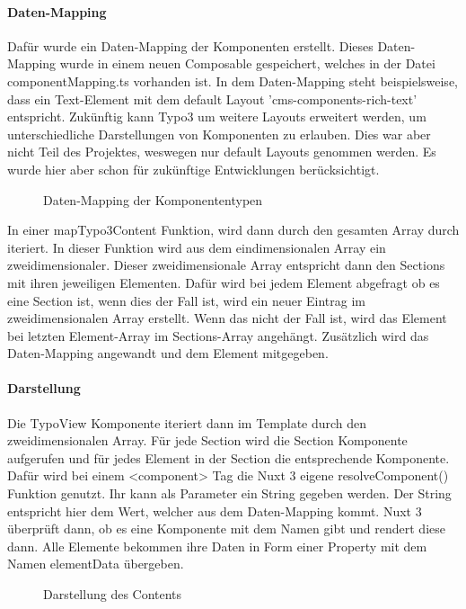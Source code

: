 \paragraph{Daten-Mapping}

Dafür wurde ein Daten-Mapping der Komponenten erstellt. Dieses Daten-Mapping wurde in einem neuen Composable gespeichert, welches in der Datei componentMapping.ts vorhanden ist. In dem Daten-Mapping steht beispielsweise, dass ein Text-Element mit dem default Layout 'cms-components-rich-text' entspricht. Zukünftig kann Typo3 um weitere Layouts erweitert werden, um unterschiedliche Darstellungen von Komponenten zu erlauben. Dies war aber nicht Teil des Projektes, weswegen nur default Layouts genommen werden. Es wurde hier aber schon für zukünftige Entwicklungen berücksichtigt.

\begin{figure}[htb]
\centering
{}
\caption{Daten-Mapping der Komponententypen}
\end{figure}

In einer mapTypo3Content Funktion, wird dann durch den gesamten Array durch iteriert. In dieser Funktion wird aus dem eindimensionalen Array ein zweidimensionaler. Dieser zweidimensionale Array entspricht dann den Sections mit ihren jeweiligen Elementen. Dafür wird bei jedem Element abgefragt ob es eine Section ist, wenn dies der Fall ist, wird ein neuer Eintrag im zweidimensionalen Array erstellt. Wenn das nicht der Fall ist, wird das Element bei letzten Element-Array im Sections-Array angehängt. Zusätzlich wird das Daten-Mapping angewandt und dem Element mitgegeben. 

\paragraph{Darstellung}
Die TypoView Komponente iteriert dann im Template durch den zweidimensionalen Array. Für jede Section wird die Section Komponente aufgerufen und für jedes Element in der Section die entsprechende Komponente. Dafür wird bei einem <component> Tag die Nuxt 3 eigene resolveComponent() Funktion genutzt. Ihr kann als Parameter ein String gegeben werden. Der String entspricht hier dem Wert, welcher aus dem Daten-Mapping kommt. Nuxt 3 überprüft dann, ob es eine Komponente mit dem Namen gibt und rendert diese dann. Alle Elemente bekommen ihre Daten in Form einer Property mit dem Namen elementData übergeben.

\begin{figure}[htb]
\centering
{}
\caption{Darstellung des Contents}
\end{figure}


